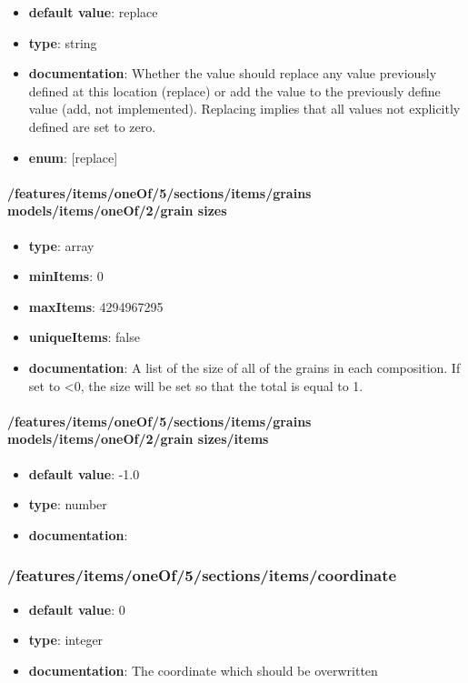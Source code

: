 \begin{itemize}\item {\bf default value}: replace
\item {\bf type}: string
\item {\bf documentation}: Whether the value should replace any value previously defined at this location (replace) or add the value to the previously define value (add, not implemented). Replacing implies that all values not explicitly defined are set to zero.
\item {\bf enum}: [replace]\end{itemize}\paragraph{/features/items/oneOf/5/sections/items/grains models/items/oneOf/2/grain sizes}
\begin{itemize}\item {\bf type}: array
\item {\bf minItems}: 0
\item {\bf maxItems}: 4294967295
\item {\bf uniqueItems}: false
\item {\bf documentation}: A list of the size of all of the grains in each composition. If set to <0, the size will be set so that the total is equal to 1.
\end{itemize}\paragraph{/features/items/oneOf/5/sections/items/grains models/items/oneOf/2/grain sizes/items}
\begin{itemize}\item {\bf default value}: -1.0
\item {\bf type}: number
\item {\bf documentation}: 
\end{itemize}\subsubsection{/features/items/oneOf/5/sections/items/coordinate}
\begin{itemize}\item {\bf default value}: 0
\item {\bf type}: integer
\item {\bf documentation}: The coordinate which should be overwritten
\end{itemize}